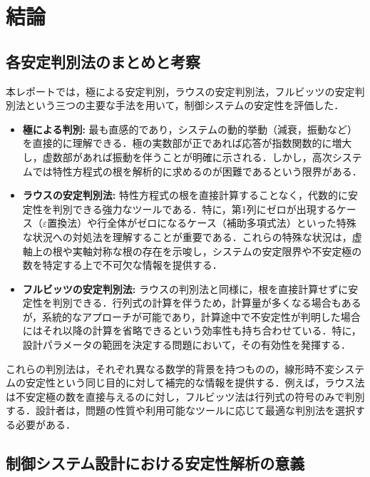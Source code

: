 \documentclass[11pt,a4paper]{ltjsarticle}
\begin{document}
\section{結論}

\subsection{各安定判別法のまとめと考察}

本レポートでは，極による安定判別，ラウスの安定判別法，フルビッツの安定判別法という三つの主要な手法を用いて，制御システムの安定性を評価した．

\begin{itemize}
\item \textbf{極による判別:} 最も直感的であり，システムの動的挙動（減衰，振動など）を直接的に理解できる．極の実数部が正であれば応答が指数関数的に増大し，虚数部があれば振動を伴うことが明確に示される．しかし，高次システムでは特性方程式の根を解析的に求めるのが困難であるという限界がある．

\item \textbf{ラウスの安定判別法:} 特性方程式の根を直接計算することなく，代数的に安定性を判別できる強力なツールである．特に，第1列にゼロが出現するケース（$\varepsilon$置換法）や行全体がゼロになるケース（補助多項式法）といった特殊な状況への対処法を理解することが重要である．これらの特殊な状況は，虚軸上の根や実軸対称な根の存在を示唆し，システムの安定限界や不安定極の数を特定する上で不可欠な情報を提供する．

\item \textbf{フルビッツの安定判別法:} ラウスの判別法と同様に，根を直接計算せずに安定性を判別できる．行列式の計算を伴うため，計算量が多くなる場合もあるが，系統的なアプローチが可能であり，計算途中で不安定性が判明した場合にはそれ以降の計算を省略できるという効率性も持ち合わせている．特に，設計パラメータの範囲を決定する問題において，その有効性を発揮する．
\end{itemize}

これらの判別法は，それぞれ異なる数学的背景を持つものの，線形時不変システムの安定性という同じ目的に対して補完的な情報を提供する．例えば，ラウス法は不安定極の数を直接与えるのに対し，フルビッツ法は行列式の符号のみで判別する．設計者は，問題の性質や利用可能なツールに応じて最適な判別法を選択する必要がある．

\subsection{制御システム設計における安定性解析の意義}
\end{document}
